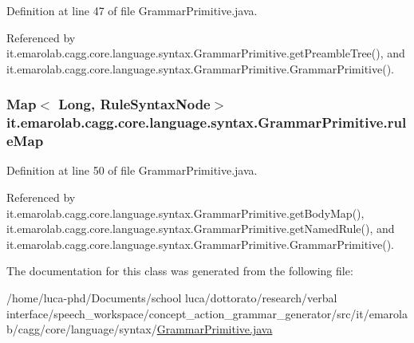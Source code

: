 Definition at line 47 of file Grammar\-Primitive.\-java.



Referenced by it.\-emarolab.\-cagg.\-core.\-language.\-syntax.\-Grammar\-Primitive.\-get\-Preamble\-Tree(), and it.\-emarolab.\-cagg.\-core.\-language.\-syntax.\-Grammar\-Primitive.\-Grammar\-Primitive().

\hypertarget{classit_1_1emarolab_1_1cagg_1_1core_1_1language_1_1syntax_1_1GrammarPrimitive_a1c9fa16adecc71a44b6d893f62dba053}{
\subsubsection[{rule\-Map}]{\setlength{\rightskip}{0pt plus 5cm}Map$<$ Long, {\bf Rule\-Syntax\-Node}$>$ it.\-emarolab.\-cagg.\-core.\-language.\-syntax.\-Grammar\-Primitive.\-rule\-Map\hspace{0.3cm}{\ttfamily [private]}}}\label{classit_1_1emarolab_1_1cagg_1_1core_1_1language_1_1syntax_1_1GrammarPrimitive_a1c9fa16adecc71a44b6d893f62dba053}


Definition at line 50 of file Grammar\-Primitive.\-java.



Referenced by it.\-emarolab.\-cagg.\-core.\-language.\-syntax.\-Grammar\-Primitive.\-get\-Body\-Map(), it.\-emarolab.\-cagg.\-core.\-language.\-syntax.\-Grammar\-Primitive.\-get\-Named\-Rule(), and it.\-emarolab.\-cagg.\-core.\-language.\-syntax.\-Grammar\-Primitive.\-Grammar\-Primitive().



The documentation for this class was generated from the following file\-:\begin{DoxyCompactItemize}
\item 
/home/luca-\/phd/\-Documents/school luca/dottorato/research/verbal interface/speech\-\_\-workspace/concept\-\_\-action\-\_\-grammar\-\_\-generator/src/it/emarolab/cagg/core/language/syntax/\hyperlink{GrammarPrimitive_8java}{Grammar\-Primitive.\-java}\end{DoxyCompactItemize}
